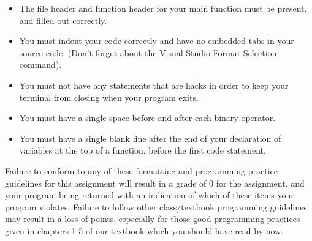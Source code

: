 \documentclass[11pt]{article}
\begin{document}
\begin{itemize}
\item The file header and function header for your main function must be present, and filled out correctly.
\item You must indent your code correctly and have no embedded tabs in your source code. (Don't forget about the Visual Studio Format Selection command).
\item You must not have any statements that are hacks in order to keep your terminal from closing when your program exits.
\item You must have a single space before and after each binary operator.
\item You must have a single blank line after the end of your declaration
  of variables at the top of a function, before the first code
  statement.
\end{itemize}

Failure to conform to any of these formatting and programming practice
guidelines for this assignment will result in a grade of 0 for the
assignment, and your program being returned with an indication of
which of these items your program violates.  Failure to follow other
class/textbook programming guidelines may result in a loss of points,
especially for those good programming practices given in chapters 1-5
of our textbook which you should have read by now.
\end{document}
